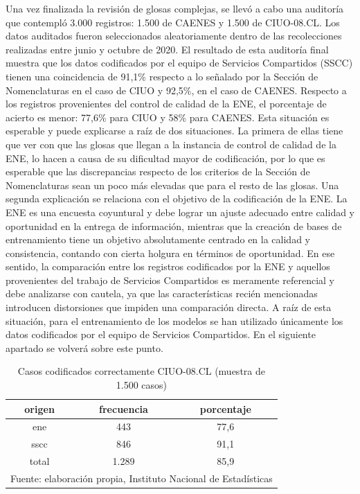 \documentclass[
  12pt,
  spanish,
]{article}
\begin{document}
Una vez finalizada la revisión de glosas complejas, se llevó a cabo una
auditoría que contempló 3.000 registros: 1.500 de CAENES y 1.500 de
CIUO-08.CL. Los datos auditados fueron seleccionados aleatoriamente
dentro de las recolecciones realizadas entre junio y octubre de 2020. El
resultado de esta auditoría final muestra que los datos codificados por
el equipo de Servicios Compartidos (SSCC) tienen una coincidencia de
91,1\% respecto a lo señalado por la Sección de Nomenclaturas en el caso
de CIUO y 92,5\%, en el caso de CAENES. Respecto a los registros
provenientes del control de calidad de la ENE, el porcentaje de acierto
es menor: 77,6\% para CIUO y 58\% para CAENES. Esta situación es
esperable y puede explicarse a raíz de dos situaciones. La primera de
ellas tiene que ver con que las glosas que llegan a la instancia de
control de calidad de la ENE, lo hacen a causa de su dificultad mayor de
codificación, por lo que es esperable que las discrepancias respecto de
los criterios de la Sección de Nomenclaturas sean un poco más elevadas
que para el resto de las glosas. Una segunda explicación se relaciona
con el objetivo de la codificación de la ENE. La ENE es una encuesta
coyuntural y debe lograr un ajuste adecuado entre calidad y oportunidad
en la entrega de información, mientras que la creación de bases de
entrenamiento tiene un objetivo absolutamente centrado en la calidad y
consistencia, contando con cierta holgura en términos de oportunidad. En
ese sentido, la comparación entre los registros codificados por la ENE y
aquellos provenientes del trabajo de Servicios Compartidos es meramente
referencial y debe analizarse con cautela, ya que las características
recién mencionadas introducen distorsiones que impiden una comparación
directa. A raíz de esta situación, para el entrenamiento de los modelos
se han utilizado únicamente los datos codificados por el equipo de
Servicios Compartidos. En el siguiente apartado se volverá sobre este
punto.

\begin{table}[H]

\caption{\label{tab:mostrar_tabla_audi_final}\label{ciuo_audi_final}Casos codificados correctamente CIUO-08.CL (muestra de 1.500 casos)}
\centering
\fontsize{9.5}{11.5}\selectfont
\begin{tabular}[t]{ccc}
\toprule
origen & frecuencia & porcentaje\\
\midrule
ene & 443 & 77,6\\
sscc & 846 & 91,1\\
total & 1.289 & 85,9\\
\bottomrule
\multicolumn{3}{l}{\rule{0pt}{1em}Fuente: elaboración propia, Instituto Nacional de Estadísticas }\\
\end{tabular}
\end{table}
\end{document}
